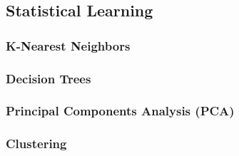 \documentclass[english]{article}
\begin{document}
\begin{multicols*}{2}
\newpage
\part{Statistical Learning}\label{part:statLearn}
\section{K-Nearest Neighbors}\label{sec:KNN}


\newpage
\section{Decision Trees}


\newpage
\section{Principal Components Analysis (PCA)}\label{sec:PCA}


\newpage
\section{Clustering}





\end{multicols*}
\end{document}
